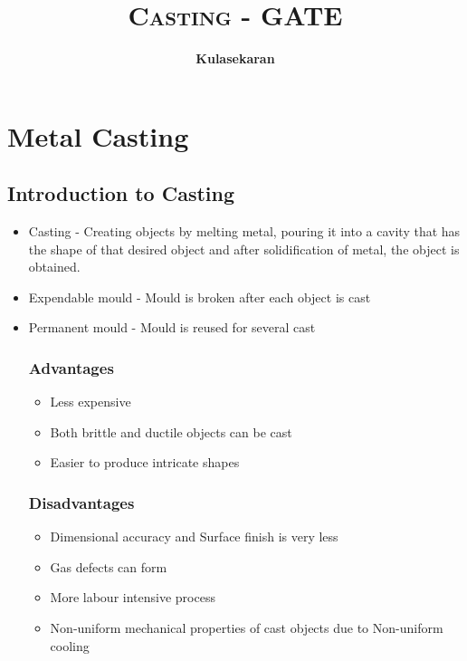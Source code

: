 \documentclass[8pt]{report}
\title{\Huge{\textsc{Casting - GATE}}}
\author{\huge{\textbf{Kulasekaran}}}
\begin{document}
\maketitle
\tableofcontents
\chapter{Metal Casting}
\section{Introduction to Casting}
	\begin{itemize}
		\item Casting - Creating objects by melting metal, pouring it into a cavity that has the shape of that desired object and after solidification of metal, the object is obtained.
		\item Expendable mould - Mould is broken after each object is cast
		\item Permanent mould - Mould is reused for several cast
		\subsection{Advantages}
			\begin{itemize}
				\item Less expensive
				\item Both brittle and ductile objects can be cast
				\item Easier to produce intricate shapes
			\end{itemize}
		\subsection{Disadvantages}
			\begin{itemize}
				\item Dimensional accuracy and Surface finish is very less
				\item Gas defects can form
				\item More labour intensive process
				\item Non-uniform mechanical properties of cast objects due to Non-uniform cooling
			\end{itemize}
	\end{itemize}\hrulefill
\end{document}
